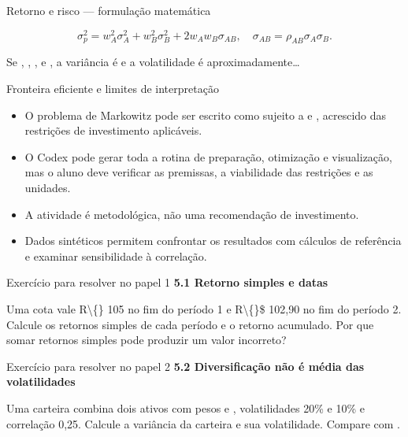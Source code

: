 \documentclass[10pt,aspectratio=169]{beamer}
\begin{document}
\begin{frame}[t]{Retorno e risco — formulação matemática}
\small
\vspace{3mm}\begin{center}\small\[\sigma_p^2=w_A^2\sigma_A^2+w_B^2\sigma_B^2+2w_Aw_B\sigma_{AB},\quad
\sigma_{AB}=\rho_{AB}\sigma_A\sigma_B.\]\end{center}
\vspace{3mm}\small Se , , , e , a variância é e a volatilidade é aproximadamente…
\end{frame}

\begin{frame}[t]{Fronteira eficiente e limites de interpretação}
\small
\begin{itemize}
\item O problema de Markowitz pode ser escrito como sujeito a e , acrescido das restrições de investimento aplicáveis.
\item O Codex pode gerar toda a rotina de preparação, otimização e visualização, mas o aluno deve verificar as premissas, a viabilidade das restrições e as unidades.
\item A atividade é metodológica, não uma recomendação de investimento.
\item Dados sintéticos permitem confrontar os resultados com cálculos de referência e examinar sensibilidade à correlação.
\end{itemize}
\end{frame}

\begin{frame}[t]{Exercício para resolver no papel 1}
\small
\small\textbf{5.1 Retorno simples e datas}\par\vspace{4mm}Uma cota vale R\textbackslash\{\} 105 no fim do período 1 e R\textbackslash\{\}\$ 102,90 no fim do período 2. Calcule os retornos simples de cada período e o retorno acumulado. Por que somar retornos simples pode produzir um valor incorreto?
\end{frame}

\begin{frame}[t]{Exercício para resolver no papel 2}
\small
\small\textbf{5.2 Diversificação não é média das volatilidades}\par\vspace{4mm}Uma carteira combina dois ativos com pesos e , volatilidades 20\% e 10\% e correlação 0,25. Calcule a variância da carteira e sua volatilidade. Compare com .
\end{frame}
\end{document}
